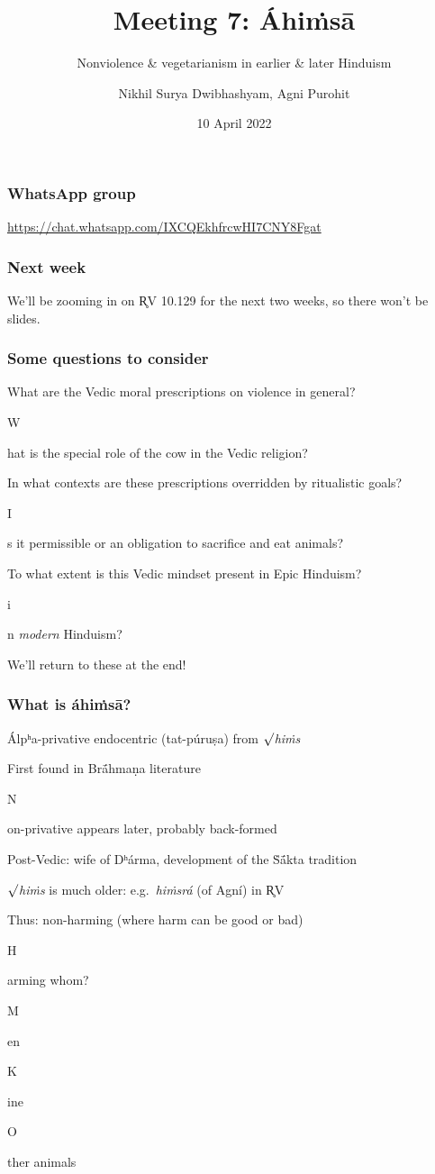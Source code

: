 \documentclass[pdf]{beamer}
\title{Meeting 7: Áhiṁsā}
\subtitle{Nonviolence \& vegetarianism in earlier \& later Hinduism}
\author{Nikhil Surya Dwibhashyam, Agni Purohit}
\date{10 April 2022}
\newcommand{\Subitem}[1]{{\setlength\itemindent{12pt} \item[-] #1}}
\newcommand{\Subsubitem}[1]{{\setlength\itemindent{24pt} \item[○] #1}}
\begin{document}
\frame{\titlepage}

\begin{frame} \frametitle{WhatsApp group}
\begin{center}
	\href{https://chat.whatsapp.com/IXCQEkhfrcwHI7CNY8Fgat}{https://chat.whatsapp.com/IXCQEkhfrcwHI7CNY8Fgat}
\end{center}
\end{frame}

\begin{frame} \frametitle{Next week}
\begin{center}
	We'll be zooming in on R̥V 10.129 for the next two weeks, so there won't be slides.
\end{center}
\end{frame}

\begin{frame}[label=questions] \frametitle{Some questions to consider}
\begin{itemize}
	\item What are the Vedic moral prescriptions on violence in general?
	\Subitem What is the special role of the cow in the Vedic religion?
	\item In what contexts are these prescriptions overridden by ritualistic goals?
	\Subitem Is it permissible or an obligation to sacrifice and eat animals?
	\item To what extent is this Vedic mindset present in Epic Hinduism?
	\Subitem in \emph{modern} Hinduism?
	\item We'll return to these at the end!
\end{itemize}
\end{frame}

\begin{frame} \frametitle{What is áhiṁsā?}
\begin{itemize}
	\item Álpʰa-privative endocentric (tat-púruṣa) from $\surd$\textit{hiṁs}
	\item First found in Brā́hmaṇa literature
	\Subitem Non-privative appears later, probably back-formed
    \item Post-Vedic: wife of Dʰárma, development of the Ṡā́kta tradition
	\item $\surd$\textit{hiṁs} is much older: e.g.~\textit{hiṁsrá} (of Agní) in R̥V
	\item Thus: non-harming (where harm can be good or bad)
	\Subitem Harming whom?
	\Subsubitem Men
	\Subsubitem Kine
	\Subsubitem Other animals
\end{itemize}
\end{frame}
\end{document}
